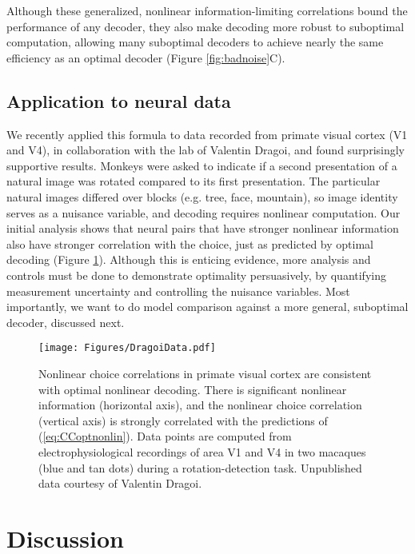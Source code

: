 \documentclass[11pt,twocolumn]{article}
\begin{document}
Although these generalized, nonlinear information-limiting correlations bound the performance of any decoder, they also make decoding more robust to suboptimal computation, allowing many suboptimal decoders to achieve nearly the same efficiency as an optimal decoder (Figure \ref{fig:badnoise}C).



\subsection{Application to neural data}

We recently applied this formula to data recorded from primate visual cortex (V1 and V4), in collaboration with the lab of Valentin Dragoi, and found surprisingly supportive results. Monkeys were asked to indicate if a second presentation of a natural image was rotated compared to its first presentation. The particular natural images differed over blocks (e.g. tree, face, mountain), so image identity serves as a nuisance variable, and decoding requires nonlinear computation. Our initial analysis shows that neural pairs that have stronger nonlinear information also have stronger correlation with the choice, just as predicted by optimal decoding (Figure \ref{fig:dragoidata}). Although this is enticing evidence, more analysis and controls must be done to demonstrate optimality persuasively, by quantifying measurement uncertainty and controlling the nuisance variables. Most importantly, we want to do model comparison against a more general, suboptimal decoder, discussed next.


\begin{figure}[hbtp]
  \centering
  \texttt{[image: Figures/DragoiData.pdf]}
  \caption{Nonlinear choice correlations in primate visual cortex are consistent with optimal nonlinear decoding. There is significant nonlinear information (horizontal axis), and the nonlinear choice correlation (vertical axis) is strongly correlated with the predictions of (\ref{eq:CCoptnonlin}). Data points are computed from electrophysiological recordings of area V1 and V4 in two macaques (blue and tan dots) during a rotation-detection task. Unpublished data courtesy of Valentin Dragoi.}
    \label{fig:dragoidata}
\end{figure}







\section{Discussion}
\end{document}
